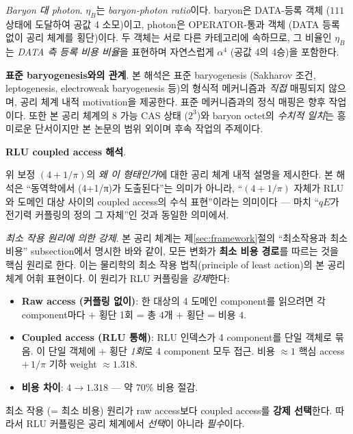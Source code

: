 \documentclass[entropy,article,submit,pdftex,oneauthor]{Definitions/mdpi}
\begin{document}
\emph{Baryon 대 photon}. $\eta_B$는 \emph{baryon-photon ratio}이다. baryon은 DATA-등록 객체 ($111$ 상태에 도달하여 공값 4 소모)이고, photon은 OPERATOR-통과 객체 (DATA 등록 없이 공리 체계를 횡단)이다. 두 객체는 서로 다른 카테고리에 속하므로, 그 비율인 $\eta_B$는 \emph{DATA 측 등록 비용 비율}을 표현하며 자연스럽게 $\alpha^4$ (공값 4의 4승)을 포함한다.

\textbf{표준 baryogenesis와의 관계}. 본 해석은 표준 baryogenesis (Sakharov 조건, leptogenesis, electroweak baryogenesis 등)의 형식적 메커니즘과 \emph{직접} 매핑되지 않으며, 공리 체계 내적 motivation을 제공한다. 표준 메커니즘과의 정식 매핑은 향후 작업이다. 또한 본 공리 체계의 8 가능 CAS 상태 ($2^3$)와 baryon octet의 \emph{수치적 일치}는 흥미로운 단서이지만 본 논문의 범위 외이며 후속 작업의 주제이다.

\textbf{RLU coupled access 해석}.

위 보정 $(4 + 1/\pi)$의 \emph{왜 이 형태인가}에 대한 공리 체계 내적 설명을 제시한다. 본 해석은 ``동역학에서 (4+1/π)가 도출된다''는 의미가 아니라, ``$(4 + 1/\pi)$ 자체가 RLU와 도메인 대상 사이의 coupled access의 수식 표현''이라는 의미이다 — 마치 ``$qE$가 전기력 커플링의 정의 그 자체''인 것과 동일한 의미에서.

\emph{최소 작용 원리에 의한 강제}. 본 공리 체계는 제\ref{sec:framework}절의 ``최소작용과 최소비용'' subsection에서 명시한 바와 같이, 모든 변화가 \textbf{최소 비용 경로}를 따르는 것을 핵심 원리로 한다. 이는 물리학의 최소 작용 법칙(principle of least action)의 본 공리 체계 어휘 표현이다. 이 원리가 RLU 커플링을 \emph{강제}한다:

\begin{itemize}
\item \textbf{Raw access (커플링 없이)}: 한 대상의 4 도메인 component를 읽으려면 각 component마다 $+$ 횡단 1회 = 총 $4$개 $+$ 횡단 = 비용 $4$.
\item \textbf{Coupled access (RLU 통해)}: RLU 인덱스가 4 component를 단일 객체로 묶음. 이 단일 객체에 $+$ 횡단 \emph{1회}로 4 component 모두 접근. 비용 $\approx 1$ 핵심 access $+ \, 1/\pi$ 기하 weight $\approx 1.318$.
\item \textbf{비용 차이}: $4 \to 1.318$ — 약 $70\%$ 비용 절감.
\end{itemize}

최소 작용 (= 최소 비용) 원리가 raw access보다 coupled access를 \textbf{강제 선택}한다. 따라서 RLU 커플링은 공리 체계에서 \emph{선택}이 아니라 \emph{필수}이다.
\end{document}
